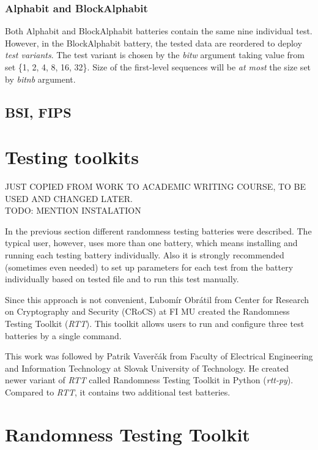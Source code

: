 \documentclass[
  digital,     %
  oneside,     %
  nosansbold,  %
  nocolorbold, %
  nolof,         %
  nolot,         %
]{fithesis4}
\begin{document}
\subsubsection{Alphabit and BlockAlphabit}
Both Alphabit and BlockAlphabit batteries contain the same nine individual test. However, in the BlockAlphabit battery, the tested data are reordered to deploy \emph{test variants}. The test variant is chosen by the \emph{bit\textunderscore w} argument taking value from set \{1, 2, 4, 8, 16, 32\}. \cite[p. 155]{tu01_guide} Size of the first-level sequences will be \emph{at most} the size set by \emph{bit\textunderscore nb} argument.



\subsection{BSI, FIPS}

\section{Testing toolkits}\label{analysis}
JUST COPIED FROM WORK TO ACADEMIC WRITING COURSE, TO BE USED AND CHANGED LATER.\\

TODO: MENTION INSTALATION

In the previous section different randomness testing batteries were described. The typical user, however, uses more than one battery, which means installing and running each testing battery individually. Also it is strongly recommended (sometimes even needed) to set up parameters for each test from the battery individually based on tested file and to run this test manually.

Since this approach is not convenient, Ľubomír Obrátil from Center for Research on Cryptography and Security (CRoCS) at FI MU created the Randomness Testing Toolkit (\emph{RTT}). This toolkit allows users to run and configure three test batteries by a single command.

This work was followed by Patrik Vaverčák from Faculty of Electrical Engineering and Information Technology at Slovak University of Technology. He created newer variant of \emph{RTT} called Randomness Testing Toolkit in Python (\emph{rtt-py}). Compared to \emph{RTT}, it contains two additional test batteries. 

\section{Randomness Testing Toolkit}
\end{document}
